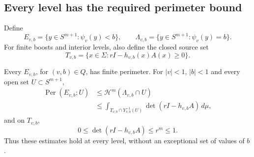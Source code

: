 \subsection{Every level has the required perimeter bound}

Define
\[
 E_{v,b}=\{y\in S^{m+1}:\psi_v(y)<b\},\qquad
 \Lambda_{v,b}=\{y\in S^{m+1}:\psi_v(y)=b\}.
\]
For finite boosts and interior levels, also define the closed source set
\[
 T_{v,b}=\{x\in\Sigma:rI-h_{v,b}(x)A(x)\ge0\}.
\]

\begin{lemma}\label{lem:family-all-levels}
Every $E_{v,b}$, for $(v,b)\in Q$, has finite perimeter.
For $|v|<1$, $|b|<1$ and every open set $U\subset S^{m+1}$,
\begin{equation}\label{eq:family-restricted-perimeter}
 \begin{split}
 \operatorname{Per}(E_{v,b};U)
 &\le\mathcal H^m(\Lambda_{v,b}\cap U)\\
 &\le\int_{T_{v,b}\cap Y_{v,b}^{-1}(U)}
       \det(rI-h_{v,b}A)\,d\mu,
 \end{split}
\end{equation}
and on $T_{v,b}$,
\begin{equation}\label{eq:family-restricted-density}
 0\le\det(rI-h_{v,b}A)\le r^m\le1.
\end{equation}
Thus these estimates hold at every level, without an exceptional set
of values of $b$.
\end{lemma}

